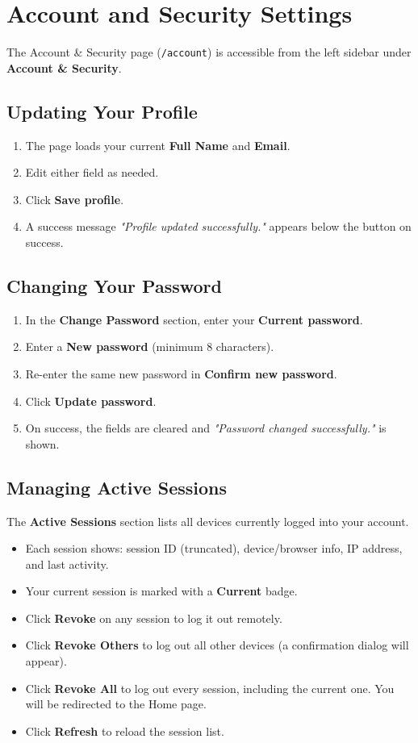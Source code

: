 \documentclass{FastFyp}
\begin{document}
\section{Account and Security Settings}

The Account \& Security page (\texttt{/account}) is accessible from the left sidebar under \textbf{Account \& Security}.

\subsection{Updating Your Profile}
\begin{enumerate}
    \item The page loads your current \textbf{Full Name} and \textbf{Email}.
    \item Edit either field as needed.
    \item Click \textbf{Save profile}.
    \item A success message \textit{"Profile updated successfully."} appears below the button on success.
\end{enumerate}

\subsection{Changing Your Password}
\begin{enumerate}
    \item In the \textbf{Change Password} section, enter your \textbf{Current password}.
    \item Enter a \textbf{New password} (minimum 8 characters).
    \item Re-enter the same new password in \textbf{Confirm new password}.
    \item Click \textbf{Update password}.
    \item On success, the fields are cleared and \textit{"Password changed successfully."} is shown.
\end{enumerate}

\subsection{Managing Active Sessions}
The \textbf{Active Sessions} section lists all devices currently logged into your account.

\begin{itemize}
    \item Each session shows: session ID (truncated), device/browser info, IP address, and last activity.
    \item Your current session is marked with a \textbf{Current} badge.
    \item Click \textbf{Revoke} on any session to log it out remotely.
    \item Click \textbf{Revoke Others} to log out all other devices (a confirmation dialog will appear).
    \item Click \textbf{Revoke All} to log out every session, including the current one. You will be redirected to the Home page.
    \item Click \textbf{Refresh} to reload the session list.
\end{itemize}
\end{document}
